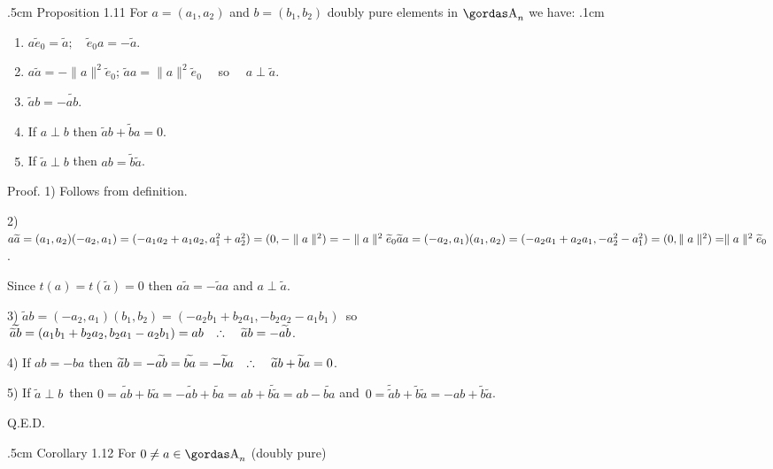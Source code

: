\vglue.5cm
\noindent
{\bsbf Proposition 1.11} For $a=(a_{1},a_{2})$ and
$b=(b_{1},b_{2})$ doubly pure elements in $\a_{n}$ we have:
\vglue.1cm
\begin{enumerate}
\item[1)]$a\widetilde{e}_{0}=\widetilde{a};\quad\widetilde{e}_{0}a=-\widetilde{a}$.
\item[2)]$a\widetilde{a}=-\parallel a\parallel^{2}\widetilde{e}_{0}$;\quad
$\widetilde{a}a=\parallel a\parallel^{2}\widetilde{e}_{0}\quad$ so
$\quad a\perp\widetilde{a}$.
\item[3)]$\widetilde{a}b=-\widetilde{ab}$.
\item[4)]If $a\perp b$ then $\widetilde{a}b+\widetilde{b}a=0$.
\item[5)]If $\widetilde{a}\perp b$ then $ab=\widetilde{b}\widetilde{a}$.
\end{enumerate}
{\bsbf Proof.} 1) Follows from definition.
\par 
2) $a\widetilde{a}=(a_{1},a_{2})(-a_{2},a_{1})
=(-a_{1}a_{2}+a_{1}a_{2},a^{2}_{1}+a^{2}_{2})
=(0,-\parallel a\parallel^{2})\\
=-\parallel a\parallel^{2}\widetilde{e}_{0}\\
\widetilde{a}a=(-a_{2},a_{1})(a_{1},a_{2})=(-a_{2}a_{1}+a_{2}a_{1},-a^{2}_{2}-a^{2}_{1})=
(0,\parallel a\parallel^{2})\\
=\parallel a\parallel^{2}\widetilde{e}_{0}$.
\par 
Since $t(a)=t(\widetilde{a})=0$ then
$a\widetilde{a}=-\widetilde{a}a$ and $a\perp\widetilde{a}$.
\par 
3) $\widetilde{a}b=(-a_{2},a_{1})(b_{1},b_{2})=
(-a_{2}b_{1}+b_{2}a_{1},-b_{2}a_{2}-a_{1}b_{1})\,$
so\\
$\,\widetilde{\widetilde{a}b}=(a_{1}b_{1}+b_{2}a_{2},b_{2}a_{1}-a_{2}b_{1})=ab
\quad\triangulo\quad \widetilde{a}b=-\widetilde{ab}$.
\par 
4) If $ab=-ba$ then $\widetilde{a}b=-\widetilde{ab}=\widetilde{ba}=-
\widetilde{b}a\quad\triangulo\quad \widetilde{a}b+\widetilde{b}a=0$.
\par 
5) If $\widetilde{a}\perp b\,$ then $0=\widetilde{ab}+
b\widetilde{a}=-\widetilde{ab}+\widetilde{ba}=ab+\widetilde{b\widetilde{a}}
=ab-\widetilde{ba}$ 
and
$\,0=\widetilde{\widetilde{a}}b+\widetilde{b}\widetilde{a}=-ab+\widetilde{b}
\widetilde{a}$.
\begin{flushright}
Q.E.D.
\end{flushright}
\vglue.5cm
\noindent
{\bsbf Corollary 1.12} For $0\neq a\in \a_{n}$ (doubly pure) \\
